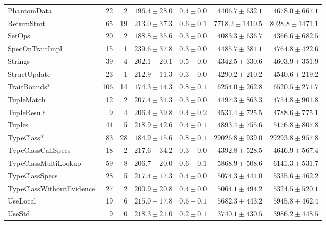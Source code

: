 \begin{table}
\begin{tabular}{lrrrrrr}
PhantomData              &   22 &    2 &     $196.4\pm28.0$ &  $0.4\pm0.0$ &   $4406.7\pm632.1$ &   $4678.0\pm667.1$ \\
ReturnStmt               &   65 &   19 &     $213.0\pm37.3$ &  $0.6\pm0.1$ &  $7718.2\pm1410.5$ &  $8028.8\pm1471.1$ \\
SetOps                   &   20 &    2 &     $188.8\pm35.6$ &  $0.3\pm0.0$ &   $4083.3\pm636.7$ &   $4366.6\pm682.5$ \\
SpecOnTraitImpl          &   15 &    1 &     $239.6\pm37.8$ &  $0.3\pm0.0$ &   $4485.7\pm381.1$ &   $4764.8\pm422.6$ \\
Strings                  &   39 &    4 &     $202.1\pm20.1$ &  $0.5\pm0.0$ &   $4342.5\pm330.6$ &   $4603.9\pm351.9$ \\
StructUpdate             &   23 &    1 &     $212.9\pm11.3$ &  $0.3\pm0.0$ &   $4290.2\pm210.2$ &   $4540.6\pm219.2$ \\
TraitBounds*             &  106 &   14 &     $174.3\pm14.3$ &  $0.8\pm0.1$ &   $6254.0\pm262.8$ &   $6520.5\pm271.7$ \\
TupleMatch               &   12 &    2 &     $207.4\pm31.3$ &  $0.3\pm0.0$ &   $4497.3\pm863.3$ &   $4754.8\pm901.8$ \\
TupleResult              &    9 &    4 &     $206.4\pm39.8$ &  $0.4\pm0.2$ &   $4531.4\pm725.5$ &   $4788.6\pm775.1$ \\
Tuples                   &   44 &    5 &     $218.9\pm42.6$ &  $0.4\pm0.1$ &   $4893.4\pm755.6$ &   $5176.8\pm807.8$ \\
TypeClass*               &   83 &   28 &     $184.9\pm15.6$ &  $0.8\pm0.1$ &  $29026.8\pm939.0$ &  $29293.8\pm957.8$ \\
TypeClassCallSpecs       &   18 &    2 &     $217.6\pm34.2$ &  $0.3\pm0.0$ &   $4392.8\pm528.5$ &   $4646.9\pm567.4$ \\
TypeClassMultiLookup     &   59 &    8 &     $206.7\pm20.0$ &  $0.6\pm0.1$ &   $5868.9\pm508.6$ &   $6141.3\pm531.7$ \\
TypeClassSpecs           &   28 &    5 &     $217.4\pm17.3$ &  $0.4\pm0.0$ &   $5074.3\pm441.0$ &   $5335.6\pm462.2$ \\
TypeClassWithoutEvidence &   27 &    2 &     $200.9\pm20.8$ &  $0.4\pm0.0$ &   $5064.1\pm494.2$ &   $5324.5\pm520.1$ \\
UseLocal                 &   19 &    6 &     $215.0\pm17.8$ &  $0.6\pm0.1$ &   $5682.3\pm443.2$ &   $5945.8\pm462.4$ \\
UseStd                   &    9 &    0 &     $218.3\pm21.0$ &  $0.2\pm0.1$ &   $3740.1\pm430.5$ &   $3986.2\pm448.5$ \\
\bottomrule
\end{tabular}
\end{table}
